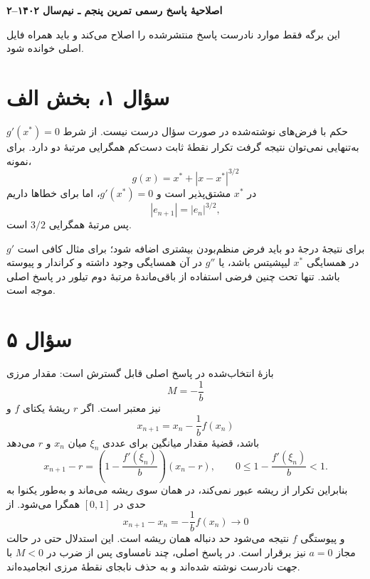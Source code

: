 \documentclass[12pt]{article}
\begin{document}
\begin{center}
  {\Large\textbf{اصلاحیهٔ پاسخ رسمی تمرین پنجم ـ نیم‌سال ۱۴۰۲--۲}}
\end{center}

این برگه فقط موارد نادرست پاسخ منتشرشده را اصلاح می‌کند و باید همراه فایل اصلی خوانده شود.

\section*{سؤال ۱، بخش الف}
حکم با فرض‌های نوشته‌شده در صورت سؤال درست نیست. از شرط
\(g'(x^*)=0\)
به‌تنهایی نمی‌توان نتیجه گرفت تکرار نقطهٔ ثابت دست‌کم همگرایی مرتبهٔ دو دارد. برای نمونه،
\[
  g(x)=x^*+|x-x^*|^{3/2}
\]
در \(x^*\) مشتق‌پذیر است و \(g'(x^*)=0\)، اما برای خطاها داریم
\[
  |e_{n+1}|=|e_n|^{3/2},
\]
پس مرتبهٔ همگرایی \(3/2\) است.

برای نتیجهٔ درجهٔ دو باید فرض منظم‌بودن بیشتری اضافه شود؛ برای مثال کافی است \(g'\) در همسایگی \(x^*\) لیپشیتس باشد، یا \(g''\) در آن همسایگی وجود داشته و کراندار و پیوسته باشد. تنها تحت چنین فرضی استفاده از باقی‌ماندهٔ مرتبهٔ دوم تیلور در پاسخ اصلی موجه است.

\section*{سؤال ۵}
بازهٔ انتخاب‌شده در پاسخ اصلی قابل گسترش است: مقدار مرزی
\[
  M=-\frac1b
\]
نیز معتبر است. اگر \(r\) ریشهٔ یکتای \(f\) و
\[
  x_{n+1}=x_n-\frac1b f(x_n)
\]
باشد، قضیهٔ مقدار میانگین برای عددی \(\xi_n\) میان \(x_n\) و \(r\) می‌دهد
\[
  x_{n+1}-r
  =\left(1-\frac{f'(\xi_n)}{b}\right)(x_n-r),
  \qquad
  0\leq1-\frac{f'(\xi_n)}b<1.
\]
بنابراین تکرار از ریشه عبور نمی‌کند، در همان سوی ریشه می‌ماند و به‌طور یکنوا به حدی در \([0,1]\) همگرا می‌شود. از
\[
  x_{n+1}-x_n=-\frac1b f(x_n)\longrightarrow0
\]
و پیوستگی \(f\) نتیجه می‌شود حد دنباله همان ریشه است. این استدلال حتی در حالت مجاز \(a=0\) نیز برقرار است. در پاسخ اصلی، چند نامساوی پس از ضرب در \(M<0\) با جهت نادرست نوشته شده‌اند و به حذف نابجای نقطهٔ مرزی انجامیده‌اند.
\end{document}
